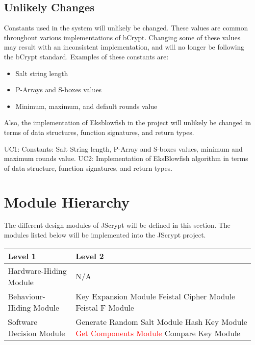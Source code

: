 \documentclass[12pt]{article}
\begin{document}
\subsection{Unlikely Changes}
Constants used in the system will unlikely be changed. These values are common throughout various implementations of bCrypt. Changing some of these values may result with an inconsistent implementation, and will no longer be following the bCrypt standard.
Examples of these constants are:
  \begin{itemize}
    \item Salt string length
    \item P-Arrays and S-boxes values
    \item Minimum, maximum, and default rounds value
	\end{itemize}
Also, the implementation of Eksblowfish in the project will unlikely be changed in terms of data structures, function signatures, and return types. \newline

UC1: Constants: Salt String length, P-Array and S-boxes values, minimum and maximum rounds value. \newline
UC2: Implementation of EksBlowfish algorithm in terms of data structure, function signatures, and return types.

\section{Module Hierarchy}

The different design modules of JScrypt will be defined in this section. The modules listed below will be implemented into the JScrypt project.
\begin{table}[H]
  \begin{tabular}{ | p{6cm} | p{7cm}|}
    \hline
        \textbf{Level 1} & \textbf{Level 2}\\
    \hline

      Hardware-Hiding Module & N/A \\
   \hline

    Behaviour-Hiding Module & Key Expansion Module \newline Feistal Cipher Module \newline Feistal F Module  \\
   \hline

    Software Decision Module & Generate Random Salt Module \newline Hash Key Module \newline \textcolor{red}{Get Components Module} \newline Compare Key Module \\
   \hline

 \end{tabular}
\end{table}
\end{document}
